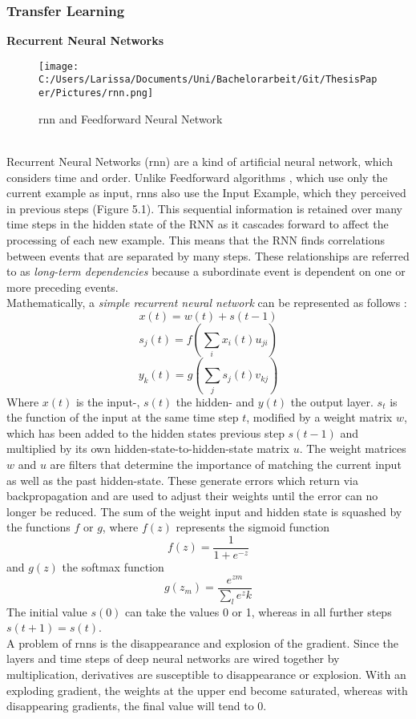 \documentclass[a4paper, 11pt,titlepage,oneside,openany]{book}
\begin{document}
\subsubsection{Transfer Learning}
\textbf{Recurrent Neural Networks}
\begin{figure}[h]
	\centering
	\texttt{[image: C:/Users/Larissa/Documents/Uni/Bachelorarbeit/Git/ThesisPaper/Pictures/rnn.png]}
	\caption{\gls{rnn} and Feedforward Neural Network \cite{rnn}}
\end{figure}\\
Recurrent Neural Networks (\gls{rnn}) are a kind of artificial neural network, which considers time and order. Unlike Feedforward algorithms \cite{feedforward}, which use only the current example as input, \gls{rnn}s also use the Input Example, which they perceived in previous steps (Figure 5.1). 
This sequential information is retained over many time steps in the hidden state of the RNN as it cascades forward to affect the processing of each new example. This means that the RNN finds correlations between events that are separated by many steps. These relationships are referred to as \textit{long-term dependencies} because a subordinate event is dependent on one or more preceding events.\\
\newpage
\noindent Mathematically, a \textit{simple recurrent neural network} \cite{ELMAN1990179} can be represented as follows \cite{rnnmodel}:
\[
x(t)=w(t)+s(t-1)
\]
\[
s_j(t)=f(\sum_{i}x_i(t)u_{ji})
\]
\[
y_k(t)=g(\sum_{j}s_j(t)v_{kj})
\]
Where $x(t)$ is the input-, $s(t)$ the hidden- and $y(t)$ the output layer. $s_t$ is the function of the input at the same time step $t$, modified by a weight matrix $w$, which has been added to the hidden states previous step $s(t-1)$ and multiplied by its own hidden-state-to-hidden-state matrix $u$. The weight matrices $w$ and $u$ are filters that determine the importance of matching the current input as well as the past hidden-state. These generate errors which return via backpropagation and are used to adjust their weights until the error can no longer be reduced. The sum of the weight input and hidden state is squashed by the functions $f$ or $g$, where  $f(z)$ represents the sigmoid function
\[
f(z)=\frac{1}{1+e^{-z}}
\]
and $g(z)$ the softmax function
\[
g(z_m)=\frac{e^{zm}}{\sum_{l}e^zk}
\]
The initial value $s(0)$ can take the values 0 or 1, whereas in all further steps $s(t+1)=s(t)$. \\
\noindent A problem of \gls{rnn}s is the disappearance and explosion of the gradient. Since the layers and time steps of deep neural networks are wired together by multiplication, derivatives are susceptible to disappearance or explosion. With an exploding gradient, the weights at the upper end become saturated, whereas with disappearing gradients, the final value will tend to 0. \\
\end{document}
